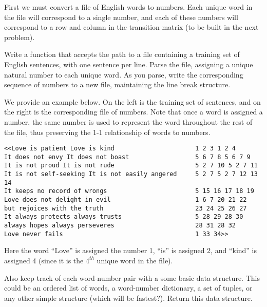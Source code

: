 \begin{problem} %
First we must convert a file of English words to numbers.
Each unique word in the file will correspond to a single number, and each of these numbers will correspond to a row and column in the transition matrix (to be built in the next problem).

Write a function that accepts the path to a file containing a training set of English sentences, with one sentence per line.
Parse the file, assigning a unique natural number to each unique word.
As you parse, write the corresponding sequence of numbers to a new file, maintaining the line break structure.

We provide an example below.
On the left is the training set of sentences, and on the right is the corresponding file of numbers.
Note that once a word is assigned a number, the same number is used to represent the word throughout the rest of the file, thus preserving the 1-1 relationship of words to numbers.

\begin{lstlisting}
<<Love is patient Love is kind 						1 2 3 1 2 4 
It does not envy It does not boast 					5 6 7 8 5 6 7 9 
It is not proud It is not rude 						5 2 7 10 5 2 7 11 
It is not self-seeking It is not easily angered  	5 2 7 5 2 7 12 13 14 
It keeps no record of wrongs						5 15 16 17 18 19 
Love does not delight in evil						1 6 7 20 21 22 
but rejoices with the truth 						23 24 25 26 27 
It always protects always trusts 					5 28 29 28 30 
always hopes always perseveres 						28 31 28 32
Love never fails 									1 33 34>>
\end{lstlisting}

Here the word ``Love'' is assigned the number 1, ``is'' is assigned 2, and ``kind'' is assigned 4 (since it is the $4^{th}$ unique word in the file).

Also keep track of each word-number pair with a some basic data structure.
This could be an ordered list of words, a word-number dictionary, a set of tuples, or any other simple structure (which will be fastest?).
Return this data structure.

\begin{comment}
Also return a list that matches the index of the list to the word assigned that number, prepending and appending unique values for the start and stop states.
The list generated by the above example could be:
\begin{lstlisting}
<<[$tart, Love, is, patient, kind, It, does, not, ..., never, fails, en&]>>
\end{lstlisting}

Examine each line, one at a time.
Check each word in the line to see if it has been assigned a number yet.
If it hasn't, then assign the word a number and write the number into a new file.
If a number has been assigned already, write it to the new file.
The line break structure should be maintained.
\end{comment}
\label{problem:str_to_int}
\end{problem}

